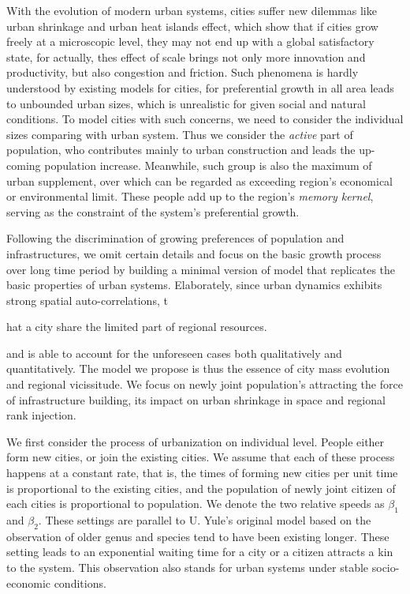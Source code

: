 \documentclass[reprint,unsortedaddress,amsmath,amssymb,aps,prl,fixfloat,showkeys]{revtex4-2}
\begin{document}
With the evolution of modern urban systems, cities suffer new dilemmas like urban shrinkage\cite{doi:10.1068/a46269,doi:10.1111/j.1468-2427.2011.01092.x} and urban heat islands effect\cite{PhysRevLett.120.108701,manoli2019magnitude}, which show that if cities grow freely at a microscopic level, they may not end up with a global satisfactory state, for actually, thes effect of scale\cite{batty2013new} brings not only more innovation and productivity, but also congestion and friction. Such phenomena is hardly understood by existing models for cities, for preferential growth in all area leads to unbounded urban sizes, which is unrealistic for given social and natural conditions. To model cities with such concerns, we need to consider the individual sizes comparing with urban system. Thus we consider the \emph{active} part of population, who contributes mainly to urban construction and leads the up-coming population increase. Meanwhile, such group is also the maximum of urban supplement, over which can be regarded as exceeding region's economical or environmental limit. These people add up to the region's \emph{memory kernel}, serving as the constraint of the system's preferential growth\cite{PhysRevE.97.022132}.

Following the discrimination of growing preferences of population and infrastructures, we omit certain details and focus on the basic growth process over long time period by building a minimal version of model that replicates the basic properties of urban systems. Elaborately, since urban dynamics exhibits strong spatial auto-correlations, t

hat a city share the limited part of regional resources. 

and is able to account for the unforeseen cases both qualitatively and quantitatively. The model we propose is thus the essence of  city mass evolution and regional vicissitude. We focus on newly joint population's attracting the force of infrastructure building, its impact on urban shrinkage in space and regional rank injection. 

We first consider the process of urbanization on individual level. People either form new cities, or join the existing cities. We assume that each of these process happens at a constant rate, that is, the times of forming new cities per unit time is proportional to the existing cities, and the population of newly joint citizen of each cities is proportional to population. We denote the two relative speeds as $\beta_1$ and $\beta_2$. These settings are parallel to U. Yule's original model\cite{yule1925ii} based on the observation of older genus and species tend to have been existing longer. These setting leads to an exponential waiting time for a city or a citizen attracts a kin to the system. This observation also stands for urban systems under stable socio-economic conditions. %
\end{document}
